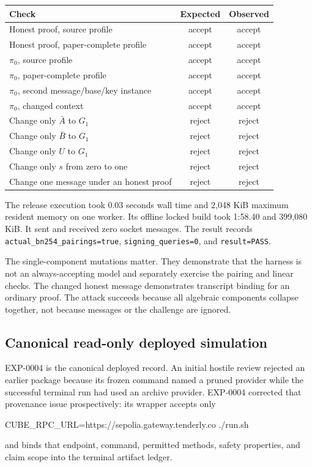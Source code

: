 \documentclass[10pt,a4paper]{article}
\begin{document}
\begin{center}
\begin{tabularx}{\textwidth}{@{}Xcc@{}}
\toprule
Check & Expected & Observed \\
\midrule
Honest proof, source profile & accept & accept \\
Honest proof, paper-complete profile & accept & accept \\
$\pi_0$, source profile & accept & accept \\
$\pi_0$, paper-complete profile & accept & accept \\
$\pi_0$, second message/base/key instance & accept & accept \\
$\pi_0$, changed context & accept & accept \\
Change only $\bar A$ to $G_1$ & reject & reject \\
Change only $\bar B$ to $G_1$ & reject & reject \\
Change only $U$ to $G_1$ & reject & reject \\
Change only $s$ from zero to one & reject & reject \\
Change one message under an honest proof & reject & reject \\
\bottomrule
\end{tabularx}
\end{center}

The release execution took 0.03 seconds wall time and 2,048 KiB maximum
resident memory on one worker. Its offline locked build took 1:58.40 and
399,080 KiB. It sent and received zero socket messages. The result records
\texttt{actual\_bn254\_pairings=true}, \texttt{signing\_queries=0}, and
\texttt{result=PASS}.

The single-component mutations matter. They demonstrate that the harness is
not an always-accepting model and separately exercise the pairing and linear
checks. The changed honest message demonstrates transcript binding for an
ordinary proof. The attack succeeds because all algebraic components collapse
together, not because messages or the challenge are ignored.

\subsection{Canonical read-only deployed simulation}\label{sec:deployed}

EXP-0004 is the canonical deployed record. An initial hostile review rejected
an earlier package because its frozen command named a pruned provider while
the successful terminal run had used an archive provider. EXP-0004 corrected
that provenance issue prospectively: its wrapper accepts only
\begin{center}
\small\ttfamily
CUBE\_RPC\_URL=https://sepolia.gateway.tenderly.co ./run.sh
\end{center}
and binds that endpoint, command, permitted methods, safety properties, and
claim scope into the terminal artifact ledger.
\end{document}
